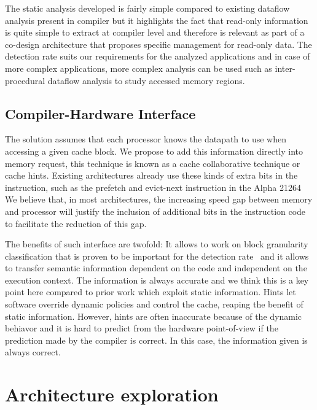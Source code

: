 \documentclass[sigconf]{acmart}
\begin{document}
The static analysis developed is fairly simple compared to existing dataflow analysis present in compiler but it highlights the fact that read-only information is quite simple to extract at compiler level and therefore is relevant as part of a co-design architecture that proposes specific management for read-only data. The detection rate suits our requirements for the analyzed applications and in case of more complex applications, more complex analysis can be used such as inter-procedural dataflow analysis to study accessed memory regions. 

\subsection{Compiler-Hardware Interface}

The solution assumes that each processor knows the datapath to use when accessing a given cache block. We propose to add this information directly into memory request, this technique is known as a cache collaborative technique or cache hints. Existing architectures already use these kinds of extra bits in the instruction, such as the prefetch and evict-next instruction in the Alpha 21264 We believe that, in most architectures, the increasing speed gap between memory and processor will justify the inclusion of additional bits in the instruction code to facilitate the reduction of this gap.

The benefits of such interface are twofold: It allows to work on block granularity classification that is proven to be important for the detection rate~\cite{Davari:2015} and it allows to transfer semantic information dependent on the code and independent on the execution context. The information is always accurate and we think this is a key point here compared to prior work which exploit static information. Hints let software override dynamic policies and control the cache, reaping the benefit of static information. However, hints are often inaccurate because of the dynamic behiavor and it is hard to predict from the hardware point-of-view if the prediction made by the compiler is correct. In this case, the information given is always correct.

\section{Architecture exploration}
\end{document}
